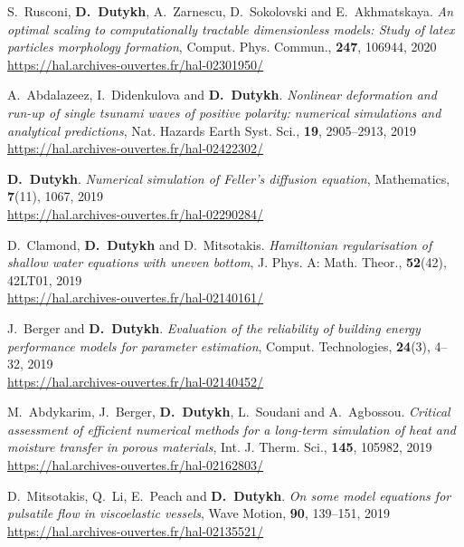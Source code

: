 \begin{etaremune}
  \item S.~Rusconi, \textbf{D.~Dutykh}, A.~Zarnescu, D.~Sokolovski and E.~Akhmatskaya. \textit{An optimal scaling to computationally tractable dimensionless models: Study of latex particles morphology formation}, Comput. Phys. Commun., \textbf{247}, 106944, 2020 \\ %
  \url{https://hal.archives-ouvertes.fr/hal-02301950/}
  
  
  \item A.~Abdalazeez, I.~Didenkulova and \textbf{D.~Dutykh}. \textit{Nonlinear deformation and run-up of single tsunami waves of positive polarity: numerical simulations and analytical predictions}, Nat. Hazards Earth Syst. Sci., \textbf{19}, 2905--2913, 2019 \\ %
  \url{https://hal.archives-ouvertes.fr/hal-02422302/}
  
  \item \textbf{D.~Dutykh}. \textit{Numerical simulation of Feller's diffusion equation}, Mathematics, \textbf{7}(11), 1067, 2019 \\ %
  \url{https://hal.archives-ouvertes.fr/hal-02290284/}
  
  \item D.~Clamond, \textbf{D.~Dutykh} and D.~Mitsotakis. \textit{Hamiltonian regularisation of shallow water equations with uneven bottom}, J. Phys. A: Math. Theor., \textbf{52}(42), 42LT01, 2019 \\ %
  \url{https://hal.archives-ouvertes.fr/hal-02140161/}
  
  \item J.~Berger and \textbf{D.~Dutykh}. \textit{Evaluation of the reliability of building energy performance models for parameter estimation}, Comput. Technologies, \textbf{24}(3), 4--32, 2019 \\ %
  \url{https://hal.archives-ouvertes.fr/hal-02140452/}
  
  \item M.~Abdykarim, J.~Berger, \textbf{D.~Dutykh}, L.~Soudani and A.~Agbossou. \textit{Critical assessment of efficient numerical methods for a long-term simulation of heat and moisture transfer in porous materials}, Int. J. Therm. Sci., \textbf{145}, 105982, 2019 \\ %
  \url{https://hal.archives-ouvertes.fr/hal-02162803/}
  
  \item D.~Mitsotakis, Q.~Li, E.~Peach and \textbf{D.~Dutykh}. \textit{On some model equations for pulsatile flow in viscoelastic vessels}, Wave Motion, \textbf{90}, 139--151, 2019 \\ %
  \url{https://hal.archives-ouvertes.fr/hal-02135521/}
  

\end{etaremune}
